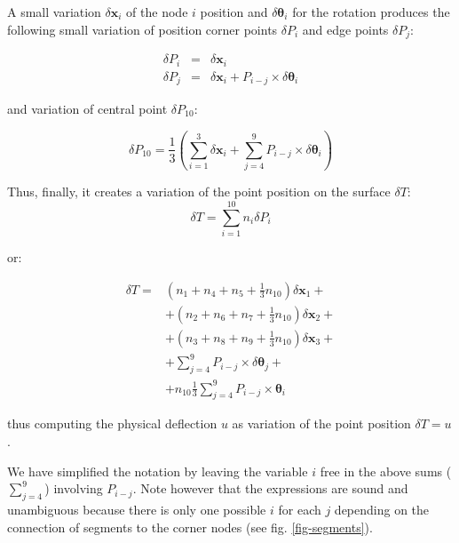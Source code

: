 \documentclass{egpubl}
\begin{document}
A small variation $\delta \mathbf{x}_i$ of the node $i$ position and $\delta \mathbf{\theta}_i$ for the rotation produces the following small variation of position corner points $\delta P_i$ and edge points $\delta P_j$:

\begin{eqnarray}
    \delta P_i & = & \delta \mathbf{x}_i \\
    \delta P_j & = & \delta \mathbf{x}_i +  P_{i-j} \times \delta \mathbf{\theta}_i
\end{eqnarray}

\noindent
and variation of central point $\delta P_{10}$:

\begin{equation}
    \delta P_{10} = \frac{1}{3} (\sum_{i=1}^3 \delta \mathbf{x}_i + \sum_{j=4}^9 P_{i-j} \times \delta \mathbf{\theta}_i)
\end{equation}

Thus, finally, it creates a variation of the point position on the surface $\delta T$:
\begin{equation}
    \delta T = \sum_{i=1}^{10} n_i  \delta P_i
\end{equation}

\noindent
or:

\begin{equation}\label{bez-delta}
    \begin{split}
        \delta T = &   (n_1 + n_4 + n_5 + \frac{1}{3} n_{10})  \delta \mathbf{x}_1 + \\
                   & + (n_2 + n_6 + n_7 + \frac{1}{3} n_{10})  \delta \mathbf{x}_2 + \\
                   & + (n_3 + n_8 + n_9 + \frac{1}{3} n_{10})  \delta \mathbf{x}_3 + \\
                   & + \sum_{j=4}^9 P_{i-j} \times \delta \mathbf{\theta}_j + \\
                   & + n_{10} \frac{1}{3} \sum_{j=4}^9 P_{i-j} \times \mathbf{\theta}_i
    \end{split}
\end{equation}

\noindent
thus computing the physical deflection $u$ as variation of the point position $\delta T = u$.

We have simplified the notation by leaving the variable $i$ free in the above sums ($\sum_{j=4}^9$) involving $P_{i-j}$.
Note however that the expressions are sound and unambiguous because there is only one possible $i$ for each $j$ depending on the connection of segments to the corner nodes (see fig. \ref{fig-segments}).
\end{document}
